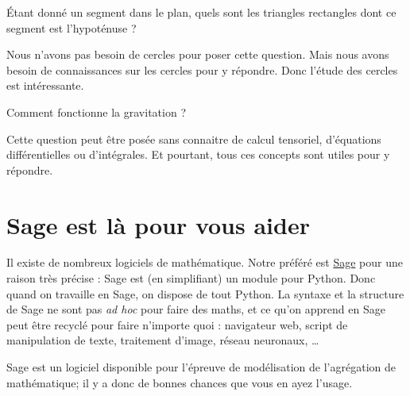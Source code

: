\begin{example}	\label{EXEooINTROmathInteressantes1}
	Étant donné un segment dans le plan, quels sont les triangles rectangles dont ce segment est l'hypoténuse ?

	Nous n'avons pas besoin de cercles pour poser cette question. Mais nous avons besoin de connaissances sur les cercles pour y répondre. Donc l'étude des cercles est intéressante.
\end{example}

\begin{example}	\label{EXEooINTROmathInteressantes2}
	Comment fonctionne la gravitation ?

	Cette question peut être posée sans connaitre de calcul tensoriel, d'équations différentielles ou d'intégrales. Et pourtant, tous ces concepts sont utiles pour y répondre.
\end{example}

\section{Sage est là pour vous aider}
\label{SECooINTROsage}

Il existe de nombreux logiciels de mathématique. Notre préféré est \href{http://www.sagemath.org}{Sage} pour une raison très précise : Sage est (en simplifiant) un module pour Python. Donc quand on travaille en Sage, on dispose de tout Python. La syntaxe et la structure de Sage ne sont pas \emph{ad hoc} pour faire des maths, et ce qu'on apprend en Sage peut être recyclé pour faire n'importe quoi : navigateur web, script de manipulation de texte, traitement d'image, réseau neuronaux, \ldots


Sage est un logiciel disponible pour l'épreuve de modélisation de l'agrégation de mathématique; il y a donc de bonnes chances que vous en ayez l'usage.

